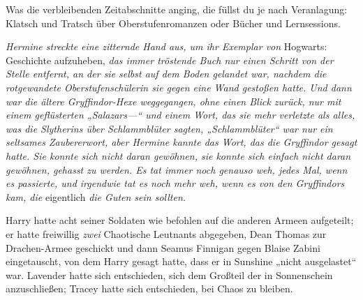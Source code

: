 Was die verbleibenden Zeitabschnitte anging, die füllst du je nach Veranlagung: Klatsch und Tratsch über Oberstufenromanzen oder Bücher und Lernsessions.

\emph{Hermine streckte eine zitternde Hand aus, um ihr Exemplar von} Hogwarts: Geschichte aufzuheben, \emph{das immer tröstende Buch nur einen Schritt von der Stelle entfernt, an der sie selbst auf dem Boden gelandet war, nachdem die rotgewandete Oberstufenschülerin sie gegen eine Wand gestoßen hatte. Und dann war die ältere Gryffindor-Hexe weggegangen, ohne einen Blick zurück, nur mit einem geflüsterten „Salazars—“ und einem Wort, das sie mehr verletzte als alles, was die Slytherins über Schlammblüter sagten, „Schlammblüter“ war nur} \emph{ein seltsames Zaubererwort, aber Hermine kannte das Wort, das die Gryffindor gesagt hatte. Sie konnte sich nicht daran gewöhnen, sie konnte sich einfach nicht daran gewöhnen, gehasst zu werden. Es tat immer noch genauso weh, jedes Mal, wenn es passierte, und irgendwie tat es noch mehr weh, wenn es von den Gryffindors kam, die} eigentlich \emph{die Guten sein sollten.}

Harry hatte acht seiner Soldaten wie befohlen auf die anderen Armeen aufgeteilt; er hatte freiwillig \emph{zwei} Chaotische Leutnants abgegeben, Dean Thomas zur Drachen-Armee geschickt und dann Seamus Finnigan gegen Blaise Zabini eingetauscht, von dem Harry gesagt hatte, dass er in Sunshine „nicht ausgelastet“ war. Lavender hatte sich entschieden, sich dem Großteil der \SPHEW in Sonnenschein anzuschließen; Tracey hatte sich entschieden, bei Chaos zu bleiben.

